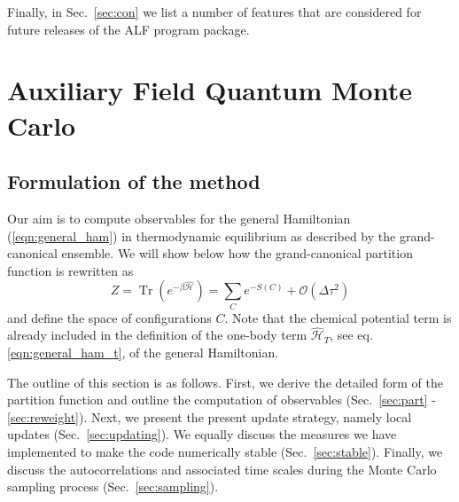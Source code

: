 \documentclass{SciPost}
\def\Tr{\mathop{\mathrm{Tr}}}
\begin{document}
Finally, in Sec.~\ref{sec:con} we list a number of features that are considered for  future releases of the ALF program package.


%
\section{Auxiliary Field Quantum Monte Carlo}\label{sec:def}
%
\subsection{Formulation of the method}  
%
Our aim is to compute observables  for the general Hamiltonian  (\ref{eqn:general_ham}) in
 thermodynamic equilibrium as described by the grand-canonical ensemble.
We will show below  how the grand-canonical partition function is rewritten as 
\begin{equation}
Z = \Tr{\left(e^{-\beta \hat{\mathcal{H}} }\right)}
= \sum_{C} e^{-S(C) } + \mathcal{O}(\Delta\tau^{2})
\end{equation}
and define the space of configurations  $C$.
Note that the chemical potential term is already included in the definition of the one-body term ${\mathcal{\hat{H}}_{T}}$, see eq. \eqref{eqn:general_ham_t}, of the general Hamiltonian.  

The outline of this section is as follows. First, we derive the detailed form of the partition function and outline the computation of observables (Sec.~\ref{sec:part} - \ref{sec:reweight}). 
Next, we present the present update strategy, namely local updates (Sec.~\ref{sec:updating}). 
We equally discuss the measures we have implemented to make the code numerically stable (Sec.~\ref{sec:stable}). Finally, we discuss the autocorrelations and associated time scales during the 
Monte Carlo sampling process (Sec.~\ref{sec:sampling}). 
\end{document}
